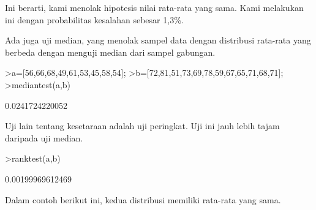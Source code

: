 \documentclass[a4paper,10pt]{article}
\begin{document}
\begin{eulernotebook}
\begin{eulercomment}
\begin{eulercomment}
\begin{eulercomment}
\begin{eulercomment}
\begin{eulercomment}
\begin{eulercomment}
\begin{eulercomment}
\begin{eulercomment}
\begin{eulercomment}
\begin{eulercomment}
\begin{eulercomment}
\begin{eulercomment}
\begin{eulercomment}
\begin{eulercomment}
\begin{eulercomment}
\begin{eulercomment}
\begin{eulercomment}
\begin{eulercomment}
\begin{eulercomment}
\begin{eulercomment}
\begin{eulercomment}
\begin{eulercomment}
\begin{eulercomment}
\begin{eulercomment}
\begin{eulercomment}
\begin{eulercomment}
\begin{eulercomment}
\begin{eulercomment}
\begin{eulercomment}
\begin{eulercomment}
\begin{eulercomment}
\begin{eulercomment}
\begin{eulercomment}
\begin{eulercomment}
\begin{eulercomment}
\begin{eulercomment}
\begin{eulercomment}
\begin{eulercomment}
\begin{eulercomment}
\begin{eulercomment}
\begin{eulercomment}
\begin{eulercomment}
\begin{eulercomment}
\begin{eulercomment}
\begin{eulercomment}
\begin{eulercomment}
\begin{euleroutput}
\end{euleroutput}
\begin{eulercomment}
Ini berarti, kami menolak hipotesis nilai rata-rata yang sama. Kami
melakukan ini dengan probabilitas kesalahan sebesar 1,3\%.

Ada juga uji median, yang menolak sampel data dengan distribusi
rata-rata yang berbeda dengan menguji median dari sampel gabungan.
\end{eulercomment}
\begin{eulerprompt}
>a=[56,66,68,49,61,53,45,58,54];
>b=[72,81,51,73,69,78,59,67,65,71,68,71];
>mediantest(a,b)
\end{eulerprompt}
\begin{euleroutput}
  0.0241724220052
\end{euleroutput}
\begin{eulercomment}
Uji lain tentang kesetaraan adalah uji peringkat. Uji ini jauh lebih
tajam daripada uji median.
\end{eulercomment}
\begin{eulerprompt}
>ranktest(a,b)
\end{eulerprompt}
\begin{euleroutput}
  0.00199969612469
\end{euleroutput}
\begin{eulercomment}
Dalam contoh berikut ini, kedua distribusi memiliki rata-rata yang
sama.

\end{eulercomment}
\end{eulercomment}
\end{eulercomment}
\end{eulercomment}
\end{eulercomment}
\end{eulercomment}
\end{eulercomment}
\end{eulercomment}
\end{eulercomment}
\end{eulercomment}
\end{eulercomment}
\end{eulercomment}
\end{eulercomment}
\end{eulercomment}
\end{eulercomment}
\end{eulercomment}
\end{eulercomment}
\end{eulercomment}
\end{eulercomment}
\end{eulercomment}
\end{eulercomment}
\end{eulercomment}
\end{eulercomment}
\end{eulercomment}
\end{eulercomment}
\end{eulercomment}
\end{eulercomment}
\end{eulercomment}
\end{eulercomment}
\end{eulercomment}
\end{eulercomment}
\end{eulercomment}
\end{eulercomment}
\end{eulercomment}
\end{eulercomment}
\end{eulercomment}
\end{eulercomment}
\end{eulercomment}
\end{eulercomment}
\end{eulercomment}
\end{eulercomment}
\end{eulercomment}
\end{eulercomment}
\end{eulercomment}
\end{eulercomment}
\end{eulercomment}
\end{eulercomment}
\end{eulernotebook}
\end{document}
